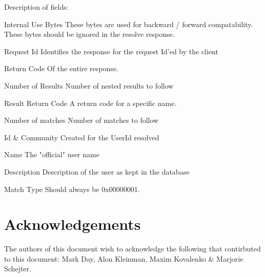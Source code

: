 \documentclass[titlepage,oneside]{book}
\begin{document}
Description of fields:

Internal Use Bytes
  These bytes are used for backward / forward compatability. These
  bytes should be ignored in the resolve response.

Request Id
  Identifies the response for the request Id'ed by the client

Return Code
  Of the entire response.

Number of Results
  Number of nested results to follow

Result Return Code
  A return code for a specific name.

Number of matches
  Number of matches to follow

Id & Community
  Created for the UserId resolved

Name
  The "official" user name

Description
  Description of the user as kept in the database

Match Type Should always be 0x00000001.

\chapter{Acknowledgements}

The authors of this document wish to acknowledge the following that
contirbuted to this document: Mark Day, Alon Kleinman, Maxim Kovalenko
& Marjorie Schejter.
\end{document}
